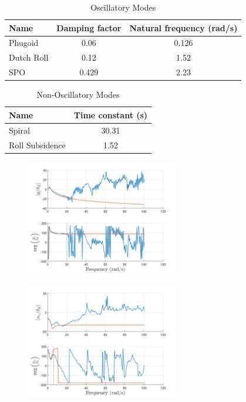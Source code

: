 \documentclass{article}
\begin{document}
\begin{table}[H]
  \centering
  \begin{tabular}{lcc}
      \toprule
      Name & Damping factor & Natural frequency (rad/s) \\
      \midrule
      Phugoid & 0.06 & 0.126 \\
      Dutch Roll & 0.12 & 1.52 \\
      SPO & 0.429 & 2.23 \\
      \bottomrule
  \end{tabular}
  \caption{Oscillatory Modes \cite{e2}}
    \label{tab:oscillatory_modes}
\end{table}

\begin{table}[H]
  \centering
  \begin{tabular}{lc}
      \toprule
      Name & Time constant (s) \\
      \midrule
      Spiral & 30.31 \\
      Roll Subsidence & 1.52 \\
      \bottomrule
  \end{tabular}
  \caption{Non-Oscillatory Modes \cite{e2}}
  \label{tab:non_oscillatory_modes}
\end{table}


\begin{figure}[H]
    \centering
    \includegraphics[width=0.6\textwidth]{elev_to_pitchrate.png}
    \caption{}
    \label{fig:elev_to_pitchrate}
  \end{figure}
  
  \begin{figure}[H]
      \centering
      \includegraphics[width=0.6\textwidth]{elevator_to_normal.png}
      \caption{}
      \label{fig:elevator_to_normal}
  \end{figure}
  
\end{document}
